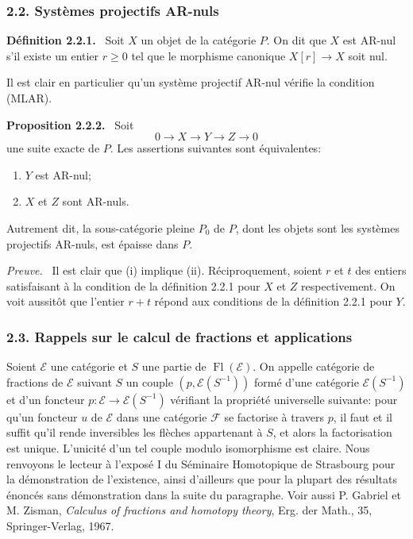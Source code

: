 \documentclass[11pt]{article}
\newenvironment{statement}[1]{\par\medskip\noindent\textbf{#1.}\ }{\par\medskip}
\newenvironment{prooftext}[1][Proof]{\par\noindent\emph{#1.}\ }{\par\medskip}
\providecommand{\Fl}{\operatorname{Fl}}
\providecommand{\cE}{\mathcal E}
\providecommand{\cF}{\mathcal F}
\begin{document}
\subsubsection*{2.2. Systèmes projectifs AR-nuls}
\begin{statement}{Définition 2.2.1}
Soit $X$ un objet de la catégorie $P$. On dit que $X$ est AR-nul s'il existe un entier $r\ge0$ tel que le morphisme canonique $X[r]\to X$ soit nul.
\end{statement}
Il est clair en particulier qu'un système projectif AR-nul vérifie la condition (MLAR).

\begin{statement}{Proposition 2.2.2}
Soit
\[
0\longrightarrow X\longrightarrow Y\longrightarrow Z\longrightarrow0
\]
une suite exacte de $P$. Les assertions suivantes sont équivalentes:
\begin{enumerate}[label=(\roman*)]
\item $Y$ est AR-nul;
\item $X$ et $Z$ sont AR-nuls.
\end{enumerate}
Autrement dit, la sous-catégorie pleine $P_0$ de $P$, dont les objets sont les systèmes projectifs AR-nuls, est épaisse dans $P$.
\end{statement}

\begin{prooftext}[Preuve]
Il est clair que (i) implique (ii). Réciproquement, soient $r$ et $t$ des entiers satisfaisant à la condition de la définition 2.2.1 pour $X$ et $Z$ respectivement. On voit aussitôt que l'entier $r+t$ répond aux conditions de la définition 2.2.1 pour $Y$.
\end{prooftext}

\subsubsection*{2.3. Rappels sur le calcul de fractions et applications}
Soient $\cE$ une catégorie et $S$ une partie de $\Fl(\cE)$. On appelle catégorie de fractions de $\cE$ suivant $S$ un couple $(p,\cE(S^{-1}))$ formé d'une catégorie $\cE(S^{-1})$ et d'un foncteur $p:\cE\to\cE(S^{-1})$ vérifiant la propriété universelle suivante: pour qu'un foncteur $u$ de $\cE$ dans une catégorie $\cF$ se factorise à travers $p$, il faut et il suffit qu'il rende inversibles les flèches appartenant à $S$, et alors la factorisation est unique. L'unicité d'un tel couple modulo isomorphisme est claire. Nous renvoyons le lecteur à l'exposé I du Séminaire Homotopique de Strasbourg pour la démonstration de l'existence, ainsi d'ailleurs que pour la plupart des résultats énoncés sans démonstration dans la suite du paragraphe. Voir aussi P. Gabriel et M. Zisman, \emph{Calculus of fractions and homotopy theory}, Erg. der Math., 35, Springer-Verlag, 1967.
\end{document}
